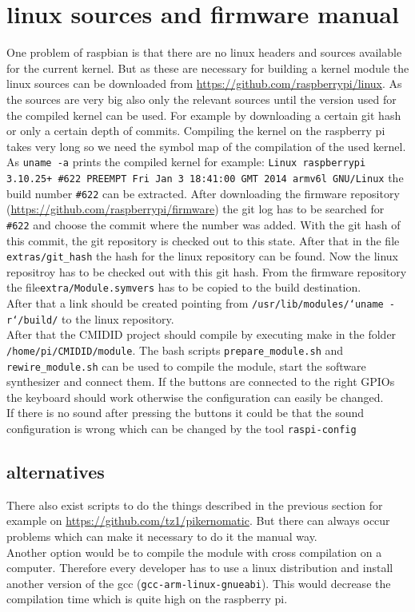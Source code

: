 \documentclass[paper=a4,fontsize=11pt,twocolumn,pagesize,bibtotoc]{scrartcl}
\begin{document}
\section{linux sources and firmware manual}
One problem of raspbian is that there are no linux headers and sources available for the current kernel.
But as these are necessary for building a kernel module the linux sources can be downloaded from \url{https://github.com/raspberrypi/linux}. 
As the sources are very big also only the relevant sources until the version used for the compiled kernel can be used. For example by downloading a certain git hash or only a certain depth of commits.
Compiling the kernel on the raspberry pi takes very long so we need the symbol map of the compilation of the used kernel.
As \texttt{uname -a} prints the compiled kernel for example: \texttt{Linux raspberrypi 3.10.25+ \#622 PREEMPT Fri Jan 3 18:41:00 GMT 2014 armv6l GNU/Linux} the build number \texttt{\#622} can be extracted.
After downloading the firmware repository (\url{https://github.com/raspberrypi/firmware}) the git log has to be searched for \texttt{\#622} and choose the commit where the number was added.
With the git hash of this commit, the git repository is checked out to this state. After that in the file \texttt{extras/git\_hash} the hash for the linux repository can be found. Now the linux repositroy has to be checked out with this git hash. From the firmware repository the file\texttt{extra/Module.symvers} has to be copied to the build destination.\cite{linuxsrc}\\
After that a link should be created pointing from \texttt{/usr/lib/modules/`uname -r`/build/} to the linux repository. \\
After that the CMIDID project should compile by executing make in the folder \texttt{/home/pi/CMIDID/module}. 
The bash scripts \texttt{prepare\_module.sh} and \texttt{rewire\_module.sh} can be used to compile the module, start the software synthesizer and connect them.
 If the buttons are connected to the right GPIOs the keyboard should work otherwise the configuration can easily be changed.\\
If there is no sound after pressing the buttons it could be that the sound configuration is wrong which can be changed by the tool \texttt{raspi-config}
\subsection{alternatives}
There also exist scripts to do the things described in the previous section for example on \url{https://github.com/tz1/pikernomatic}. But there can always occur problems which can make it necessary to do it the manual way.\\
Another option would be to compile the module with cross compilation on a computer. Therefore every developer has to use a linux distribution and install another version of the gcc (\texttt{gcc-arm-linux-gnueabi}). This would decrease the compilation time which is quite high on the raspberry pi.
\end{document}
